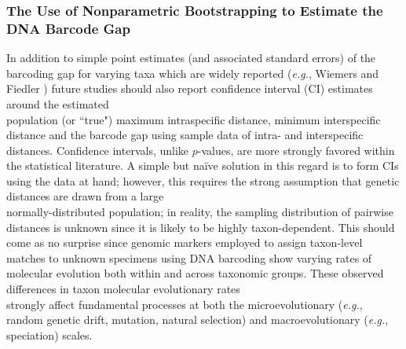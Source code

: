 \subsubsection{The Use of Nonparametric Bootstrapping to Estimate the DNA Barcode Gap}
 
In addition to simple point estimates (and associated standard errors) of the barcoding gap for varying taxa which are widely reported (\textit{e.g.}, Wiemers and Fiedler \cite{wiemers2007does}) future studies should also report confidence interval (CI) estimates around the estimated \\ population (or ``true") maximum intraspecific distance, minimum interspecific distance and the barcode gap using sample data of intra- and interspecific distances. Confidence intervals, unlike $p$-values, are more strongly favored within the statistical literature. A simple but na{\"i}ve solution in this regard is to form CIs using the data at hand; however, this requires the strong assumption that genetic distances are drawn from a large \\ normally-distributed population; in reality, the sampling distribution of pairwise distances is unknown since it is likely to be highly taxon-dependent. This should come as no surprise since genomic markers employed to assign taxon-level matches to unknown specimens using DNA barcoding show varying rates of molecular evolution both within and across taxonomic groups. These observed differences in taxon molecular evolutionary rates \\ strongly affect fundamental processes at both the microevolutionary (\textit{e.g.}, random genetic drift, mutation, natural selection) and macroevolutionary (\textit{e.g.}, speciation) scales.



